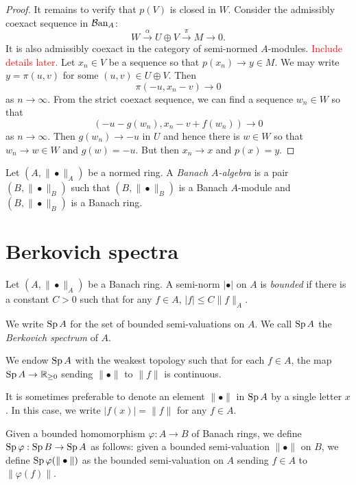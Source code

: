 \begin{proof}
    It remains to verify that $p(V)$ is closed in $W$. Consider the admissibly coexact sequence in $\mathcal{B}\mathrm{an}_A$:
    \[
      W \xrightarrow{\alpha}U\oplus V\xrightarrow{\pi} M\rightarrow 0. 
    \]
    It is also admissibly coexact in the category of semi-normed $A$-modules. \textcolor{red}{Include details later.}
    Let $x_n\in V$ be a sequence so that $p(x_n)\to y\in M$. We may write $y=\pi(u,v)$ for some $(u,v)\in U\oplus V$. Then
    \[
        \pi(-u,x_n-v)\to 0  
    \]
    as $n\to \infty$. From the strict coexact sequence, we can find a sequence $w_n\in W$ so that
    \[
        (-u-g(w_n),x_n-v+f(w_n))\to 0  
    \]
    as $n\to \infty$. Then $g(w_n)\to -u$ in $U$ and hence there is $w\in W$ so that $w_n\to w\in W$ and $g(w)=-u$. But then $x_n\to x$ and $p(x)=y$.
\end{proof}


\begin{definition}
    Let $(A,\|\bullet\|_A)$ be a normed ring. A \emph{Banach $A$-algebra} is a pair $(B,\|\bullet\|_B)$ such that $(B,\|\bullet\|_B)$ is a Banach $A$-module and $(B,\|\bullet\|_B)$ is a Banach ring.
\end{definition}

\section{Berkovich spectra}


\begin{definition}
    Let $(A,\|\bullet\|_A)$ be a Banach ring. A semi-norm $|\bullet|$ on $A$ is \emph{bounded} if there is a constant $C>0$ such that for any $f\in A$, $|f|\leq C\|f\|_A$.

    We write $\operatorname{Sp} A$ for the set of bounded semi-valuations on $A$. We call $\operatorname{Sp} A$ the \emph{Berkovich spectrum} of $A$.

    We endow $\operatorname{Sp} A$ with the weakest topology such that for each $f\in A$, the map $\operatorname{Sp} A\rightarrow \mathbb{R}_{\geq 0}$ sending $\|\bullet\|$ to $\|f\|$ is continuous.

    It is sometimes preferable to denote an element $\|\bullet\|$ in $\operatorname{Sp} A$ by a single letter $x$. In this case, we write $|f(x)|=\|f\|$ for any $f\in A$.

    Given a bounded homomorphism $\varphi:A\rightarrow B$ of Banach rings, we define $\operatorname{Sp} \varphi:\operatorname{Sp} B\rightarrow \operatorname{Sp} A$ as follows: given a bounded semi-valuation $\|\bullet\|$ on $B$, we define $\operatorname{Sp} \varphi(\|\bullet\|)$ as the bounded semi-valuation on $A$ sending $f\in A$ to $\|\varphi(f)\|$.
\end{definition}

